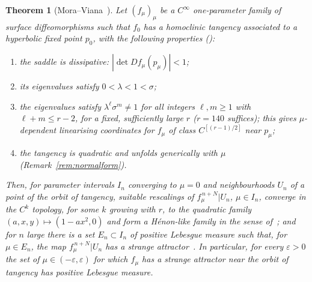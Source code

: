 \documentclass[11pt]{amsart}
\newtheorem{thm}{Theorem}[section]
\theoremstyle{definition}
\theoremstyle{remark}
\begin{document}
\begin{thm}[Mora--Viana~{\cite[Theorem~A and \S2]{MV93}}]\label{thm:MV}
Let $(f_\mu)_\mu$ be a $C^\infty$ one-parameter family of surface diffeomorphisms such that $f_0$ has a
homoclinic tangency associated to a hyperbolic fixed point $p_0$, with the following properties
(\cite[pp.~5--6]{MV93}):
\begin{enumerate}[label=\textup{(MV\arabic*)},leftmargin=*]
\item\label{MV1} the saddle is dissipative: $|\det Df_\mu(p_\mu)|<1$;
\item\label{MV2} its eigenvalues satisfy $0<\lambda<1<\sigma$;
\item\label{MV3} the eigenvalues satisfy $\lambda^\ell\sigma^m\neq1$ for all integers $\ell,m\ge1$ with $\ell+m\le r-2$,
for a fixed, sufficiently large $r$ ($r=140$ suffices); this gives $\mu$-dependent linearising coordinates for
$f_\mu$ of class $C^{[(r-1)/2]}$ near $p_\mu$;
\item\label{MV4} the tangency is quadratic and unfolds generically with $\mu$ (Remark~\ref{rem:normalform}).
\end{enumerate}
Then, for parameter intervals $I_n$ converging to $\mu=0$ and neighbourhoods $U_n$ of a point of the orbit of
tangency, suitable rescalings of $f_\mu^{\,n+N}|U_n$, $\mu\in I_n$, converge in the $C^k$ topology, for some $k$ growing with $r$, to the
quadratic family $(a,x,y)\mapsto(1-ax^2,0)$ and form a H\'enon-like family in the sense
of~\cite[Theorem~2.1]{MV93}; and for $n$ large there is a set $E_n\subset I_n$ of positive Lebesgue measure such
that, for $\mu\in E_n$, the map $f_\mu^{\,n+N}|U_n$ has a strange attractor~\cite[Theorem~B]{MV93}. In
particular, for every $\varepsilon>0$ the set of $\mu\in(-\varepsilon,\varepsilon)$ for which $f_\mu$ has a
strange attractor near the orbit of tangency has positive Lebesgue measure.
\end{thm}
\end{document}
